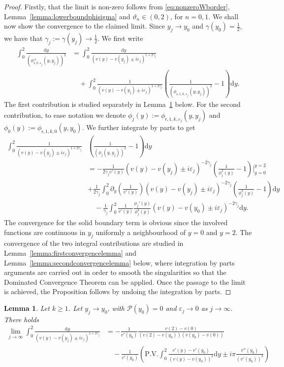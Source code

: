 \documentclass[11pt,reqno]{amsproc}
\newtheorem{lemma}[proposition]{Lemma}
\theoremstyle{definition}
\numberwithin{equation}{section}
\newcommand{\sr}{{\mathsf{r}}}
\renewcommand{\d}{\mathrm{d}}
\newcommand{\ep}{\varepsilon}
\renewcommand{\P}{{\mathcal{P}}}
\begin{document}
\begin{proof}
Firstly, that the limit is non-zero follows from \eqref{eq:nonzeroWborder}, Lemma~\ref{lemma:lowerboundphisigma} and $\vartheta_n \in (0,2)$, for $n=0,1$. We shall now show the convergence to the claimed limit. Since $y_j\rightarrow y_0$ and $\gamma(y_0)=\frac12$, we have that $\gamma_j:=\gamma(y_j) \rightarrow \frac12$. We first write
\begin{align*}
\int_0^2 \frac{\d y}{(\phi_{\sr,k,\ep_j}^\pm(y,y_j))^2} &= \int_0^2 \frac{\d y}{(v(y) - v(y_j) \pm i\ep_j)^{1+2\gamma_j}} \\
&\quad + \int_0^2 \frac{1}{(v(y) - v(y_j) \pm i\ep_j)^{1+2\gamma_j}} \left( \frac{1}{(\phi_{\sr,1,k,\ep_j}(y,y_j))^2} -1 \right) \d y.
\end{align*}
The first contribution is studied separately in Lemma~\ref{lemma:limitvelquotient} below. For the second contribution, to ease notation we denote $\phi_{j}(y):=\phi_{\sr,1,k,\ep_j}(y,y_j)$ and $\phi_{0}(y):=\phi_{\sr,1,k,0}(y,y_0)$. We further integrate by parts to get
\begin{align*}
\int_0^2 \frac{1}{(v(y) - v(y_j) \pm i\ep_j)^{1+2\gamma_j}} &\left( \frac{1}{(\phi_{j}(y,y_j))^2} -1 \right) \d y \\
&= -\frac{1}{2\gamma_j v'(y)}( v(y) - v(y_j) \pm i\ep_j)^{-2\gamma_j} \left( \frac{1}{\phi_j^2(y) } -1 \right) \Big|_{y=0}^{y=2} \\
&+\frac{1}{2\gamma_j}\int_0^2 \partial_y\left( \frac{1}{v'(y)} \right) (v(y) - v(y_j) \pm i\ep_j)^{-2\gamma_j} \left( \frac{1}{\phi_j^2(y) } -1 \right)  \d y \\
&\quad -\frac{1}{\gamma_j}\int_0^2 \frac{1}{v'(y)}\frac{\phi_j'(y)}{\phi_j^3(y)} (v(y) - v(y_0) \pm i\ep_j)^{-2\gamma_j} \d y.
\end{align*}
The convergence for the solid boundary term is obvious since the involved functions are continuous in $y_j$ uniformly a neighbourhood of $y=0$ and $y=2$. The convergence of the two integral contributions are studied in Lemma~\ref{lemma:firstconvergencelemma} and Lemma~\ref{lemma:secondconvergencelemma} below, where integration by parts arguments are carried out in order to smooth the singularities so that the Dominated Convergence Theorem can be applied. Once the passage to the limit is achieved, the Proposition follows by undoing the integration by parts.
\end{proof}


\begin{lemma}\label{lemma:limitvelquotient}
Let $k\geq 1$. Let $y_j\rightarrow y_0$, with $\P(y_0) =0$ and $\ep_j \rightarrow 0$ as $j\rightarrow \infty$. There holds
\begin{align*}
\lim_{j\rightarrow \infty}\int_0^2 \frac{\d y}{(v(y) - v(y_j) \pm i\ep_j)^{1+2\gamma_j}} &= -\frac{1}{v'(y_0)}  \frac{v(2) - v(0)}{(v(2) - v(y_0))(v(y_0) - v(0))}  \\
&\quad -\frac{1}{v'(y_0)}\left( \text{P.V.} \int_0^2 \frac{v'(y) - v'(y_0)}{(v(y) - v(y_0))^2} \d y \pm i \pi \frac{v''(y_0)}{(v'(y_0))^2} \right)
\end{align*}
\end{lemma}
\end{document}
